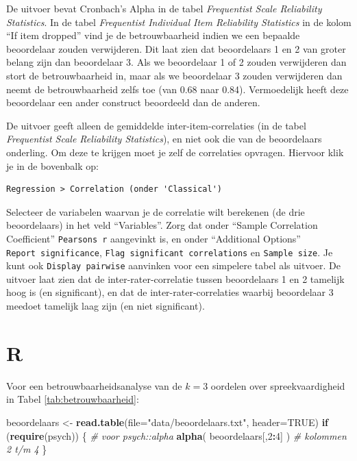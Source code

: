 \documentclass[
]{book}
\newenvironment{Shaded}{\begin{snugshade}}{\end{snugshade}}
\newcommand{\AttributeTok}[1]{\textcolor[rgb]{0.13,0.29,0.53}{#1}}
\newcommand{\CommentTok}[1]{\textcolor[rgb]{0.56,0.35,0.01}{\textit{#1}}}
\newcommand{\ConstantTok}[1]{\textcolor[rgb]{0.56,0.35,0.01}{#1}}
\newcommand{\ControlFlowTok}[1]{\textcolor[rgb]{0.13,0.29,0.53}{\textbf{#1}}}
\newcommand{\DecValTok}[1]{\textcolor[rgb]{0.00,0.00,0.81}{#1}}
\newcommand{\FunctionTok}[1]{\textcolor[rgb]{0.13,0.29,0.53}{\textbf{#1}}}
\newcommand{\NormalTok}[1]{#1}
\newcommand{\OtherTok}[1]{\textcolor[rgb]{0.56,0.35,0.01}{#1}}
\newcommand{\SpecialCharTok}[1]{\textcolor[rgb]{0.81,0.36,0.00}{\textbf{#1}}}
\newcommand{\StringTok}[1]{\textcolor[rgb]{0.31,0.60,0.02}{#1}}
\begin{document}
De uitvoer bevat Cronbach's Alpha in de tabel \emph{Frequentist Scale Reliability Statistics}. In de tabel \emph{Frequentist Individual Item Reliability Statistics} in de kolom ``If item dropped'' vind je de betrouwbaarheid indien we een bepaalde beoordelaar zouden verwijderen. Dit laat zien dat beoordelaars 1 en 2 van groter belang zijn dan beoordelaar 3. Als we beoordelaar 1 of 2 zouden verwijderen dan stort de betrouwbaarheid in, maar als we beoordelaar 3 zouden verwijderen dan neemt de betrouwbaarheid zelfs toe (van 0.68 naar 0.84). Vermoedelijk heeft deze beoordelaar een ander construct beoordeeld dan de anderen.

De uitvoer geeft alleen de gemiddelde inter-item-correlaties (in de tabel \emph{Frequentist Scale Reliability Statistics}), en niet ook die van de beoordelaars onderling. Om deze te krijgen moet je zelf de correlaties opvragen. Hiervoor klik je in de bovenbalk op:

\begin{verbatim}
Regression > Correlation (onder 'Classical')
\end{verbatim}

Selecteer de variabelen waarvan je de correlatie wilt berekenen (de drie beoordelaars) in het veld ``Variables''. Zorg dat onder ``Sample Correlation Coefficient'' \texttt{Pearson\textquotesingle{}s\ r} aangevinkt is, en onder ``Additional Options'' \texttt{Report\ significance}, \texttt{Flag\ significant\ correlations} en \texttt{Sample\ size}. Je kunt ook \texttt{Display\ pairwise} aanvinken voor een simpelere tabel als uitvoer. De uitvoer laat zien dat de inter-rater-correlatie tussen beoordelaars 1 en 2 tamelijk hoog is (en significant), en dat de inter-rater-correlaties waarbij beoordelaar 3 meedoet tamelijk laag zijn (en niet significant).

\section{R}\label{r-11}

Voor een betrouwbaarheidsanalyse van de \(k=3\) oordelen over
spreekvaardigheid in Tabel \ref{tab:betrouwbaarheid}:\\

\begin{Shaded}
\begin{Highlighting}[]
\NormalTok{beoordelaars }\OtherTok{\textless{}{-}} \FunctionTok{read.table}\NormalTok{(}\AttributeTok{file=}\StringTok{"data/beoordelaars.txt"}\NormalTok{, }\AttributeTok{header=}\ConstantTok{TRUE}\NormalTok{)}
\ControlFlowTok{if}\NormalTok{ (}\FunctionTok{require}\NormalTok{(psych)) \{ }\CommentTok{\# voor psych::alpha}
  \FunctionTok{alpha}\NormalTok{( beoordelaars[,}\DecValTok{2}\SpecialCharTok{:}\DecValTok{4}\NormalTok{] ) }\CommentTok{\# kolommen 2 t/m 4}
\NormalTok{\}}
\end{Highlighting}
\end{Shaded}
\end{document}

